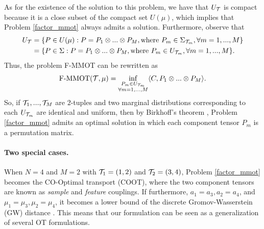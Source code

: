 As for the existence of the solution to this problem, we have that $U_{\mathcal T}$ is compact because it is a close subset of the
compact set $U(\mu)$, which implies that Problem \eqref{factor_mmot} always admits a solution. Furthermore, observe that
\begin{equation}
  \begin{split}
    U_{\mathcal T} &= \{ P \in U(\mu): P = P_1 \otimes ... \otimes P_M, \text{where } P_m \in \Sigma_{\mathcal T_m}, \forall m = 1,...,M \} \\
    &= \{ P \in \Sigma: P = P_1 \otimes ... \otimes P_M, \text{where } P_m \in U_{\mathcal T_m}, \forall m = 1,...,M \}.
  \end{split}
\end{equation}
Thus, the problem F-MMOT can be rewritten as
\begin{equation}
  \text{F-MMOT}( \mathcal T, \mu) = \inf_{\substack{P_m \in U_{\mathcal T_m} \\ \forall m = 1,...,M}}
  \langle C, P_1 \otimes ... \otimes P_M \rangle.
\end{equation}
So, if $\mathcal T_1,...,\mathcal T_M$ are $2$-tuples and two marginal distributions corresponding to each $U_{\mathcal T_m}$ are
identical and uniform, then by Birkhoff's theorem \citep{Birkhoff46}, Problem \eqref{factor_mmot} admits an optimal solution in
which each component tensor $P_m$ is a permutation matrix.

\paragraph{Two special cases.} When $N = 4$ and $M=2$ with $\mathcal T_1 = (1,2)$ and $\mathcal T_2 = (3,4)$, Problem
\eqref{factor_mmot} becomes the CO-Optimal transport (COOT), where the two component tensors are known as
\textit{sample} and \textit{feature} couplings. If furthermore, $a_1 = a_3, a_2=a_4$, and $\mu_1 = \mu_3, \mu_2=\mu_4$, it becomes a
lower bound of the discrete Gromov-Wasserstein (GW) distance \citep{Memoli11}. This means that our formulation can be seen as a
generalization of several OT formulations.

